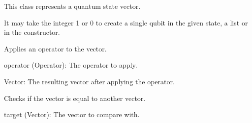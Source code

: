 \documentclass[letterpaper,10pt,english]{sphinxmanual}
\begin{document}
\begin{fulllineitems}
\label{\detokenize{index:utils.tensor.Vector}}
\pysigstartsignatures
{}
\pysigstopsignatures
\sphinxAtStartPar
This class represents a quantum state vector.

\sphinxAtStartPar
It may take the integer 1 or 0 to create a single qubit in the given state,
a list or  in the constructor.

\begin{fulllineitems}
\label{\detokenize{index:utils.tensor.Vector.apply}}
\pysigstartsignatures
{}
\pysigstopsignatures
\sphinxAtStartPar
Applies an operator to the vector.
\begin{description}
\sphinxAtStartPar
operator (Operator): The operator to apply.

\sphinxAtStartPar
Vector: The resulting vector after applying the operator.

\end{description}

\end{fulllineitems}


\begin{fulllineitems}
\label{\detokenize{index:utils.tensor.Vector.equal}}
\pysigstartsignatures
{}
\pysigstopsignatures
\sphinxAtStartPar
Checks if the vector is equal to another vector.
\begin{description}
\sphinxAtStartPar
target (Vector): The vector to compare with.


\end{description}
\end{fulllineitems}
\end{fulllineitems}
\end{document}
